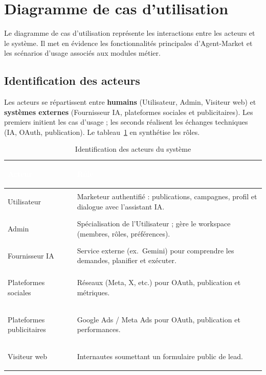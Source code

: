 \documentclass[12pt,a4paper]{report}
\numberwithin{figure}{chapter}
\numberwithin{table}{chapter}
\begin{document}
\section{Diagramme de cas d’utilisation}

Le diagramme de cas d’utilisation représente les interactions entre les acteurs et le système. Il met en évidence les fonctionnalités principales d’Agent-Market et les scénarios d’usage associés aux modules métier.

\subsection{Identification des acteurs}

Les acteurs se répartissent entre \textbf{humains} (Utilisateur, Admin, Visiteur web) et \textbf{systèmes externes} (Fournisseur IA, plateformes sociales et publicitaires). Les premiers initient les cas d’usage ; les seconds réalisent les échanges techniques (IA, OAuth, publication). Le tableau~\ref{tab:acteurs} en synthétise les rôles.

\begin{table}[H]
\centering
\caption{Identification des acteurs du système}
\label{tab:acteurs}
\renewcommand{\arraystretch}{1.35}
\begin{tabularx}{\textwidth}{|>{\bfseries\raggedright\arraybackslash}p{4.5cm}|>{\raggedright\arraybackslash}X|}
\hline
\rowcolor{tableheadergreen}
\textcolor{white}{Acteur} & \textcolor{white}{\textbf{Rôle}} \\
\hline
Utilisateur & Marketeur authentifié : publications, campagnes, profil et dialogue avec l’assistant IA. \\
\hline
Admin & Spécialisation de l’Utilisateur ; gère le workspace (membres, rôles, préférences). \\
\hline
Fournisseur IA & Service externe (ex.\ Gemini) pour comprendre les demandes, planifier et exécuter. \\
\hline
Plateformes sociales & Réseaux (Meta, X, etc.) pour OAuth, publication et métriques. \\
\hline
Plateformes publicitaires & Google Ads / Meta Ads pour OAuth, publication et performances. \\
\hline
Visiteur web & Internautes soumettant un formulaire public de lead. \\
\hline
\end{tabularx}
\end{table}
\end{document}
